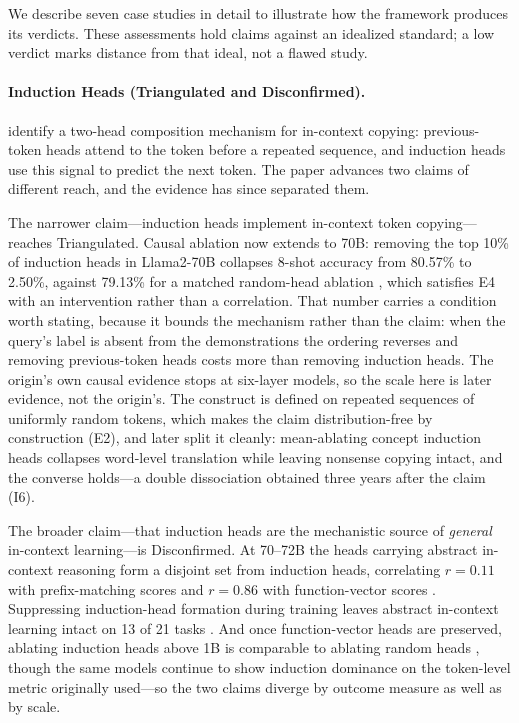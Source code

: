 \documentclass{article}
\begin{document}
We describe seven case studies in detail to illustrate how the framework produces its verdicts. These assessments hold claims against an idealized standard; a low verdict marks distance from that ideal, not a flawed study.

\paragraph{Induction Heads (Triangulated and Disconfirmed).} \citet{olsson2022context} identify a two-head composition mechanism for in-context copying: previous-token heads attend to the token before a repeated sequence, and induction heads use this signal to predict the next token. The paper advances two claims of different reach, and the evidence has since separated them.

The narrower claim---induction heads implement in-context token copying---reaches Triangulated. Causal ablation now extends to 70B: removing the top 10\% of induction heads in Llama2-70B collapses 8-shot accuracy from 80.57\% to 2.50\%, against 79.13\% for a matched random-head ablation \citep{yang2025unifying}, which satisfies E4 with an intervention rather than a correlation. That number carries a condition worth stating, because it bounds the mechanism rather than the claim: when the query's label is absent from the demonstrations the ordering reverses and removing previous-token heads costs more than removing induction heads. The origin's own causal evidence stops at six-layer models, so the scale here is later evidence, not the origin's. The construct is defined on repeated sequences of uniformly random tokens, which makes the claim distribution-free by construction (E2), and \citet{feucht2025dual} later split it cleanly: mean-ablating concept induction heads collapses word-level translation while leaving nonsense copying intact, and the converse holds---a double dissociation obtained three years after the claim (I6).

The broader claim---that induction heads are the mechanistic source of \emph{general} in-context learning---is Disconfirmed. At 70--72B the heads carrying abstract in-context reasoning form a disjoint set from induction heads, correlating $r=0.11$ with prefix-matching scores and $r=0.86$ with function-vector scores \citep{webb2025emergent}. Suppressing induction-head formation during training leaves abstract in-context learning intact on 13 of 21 tasks \citep{sahin2025incontext}. And once function-vector heads are preserved, ablating induction heads above 1B is comparable to ablating random heads \citep{yin2025which}, though the same models continue to show induction dominance on the token-level metric \citet{olsson2022context} originally used---so the two claims diverge by outcome measure as well as by scale.
\end{document}
